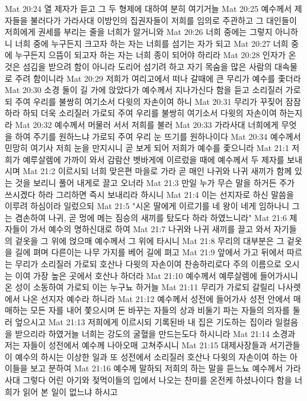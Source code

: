 Mat 20:24  열 제자가 듣고 그 두 형제에 대하여 분히 여기거늘
Mat 20:25  예수께서 제자들을 불러다가 가라사대 이방인의 집권자들이 저희를 임의로 주관하고 그 대인들이 저희에게 권세를 부리는 줄을 너희가 알거니와
Mat 20:26  너희 중에는 그렇지 아니하니 너희 중에 누구든지 크고자 하는 자는 너희를 섬기는 자가 되고
Mat 20:27  너희 중에 누구든지 으뜸이 되고자 하는 자는 너희 종이 되어야 하리라
Mat 20:28  인자가 온것은 섬김을 받으려 함이 아니라 도리어 섬기려 하고 자기 목숨을 많은 사람의 대속물로 주려 함이니라
Mat 20:29  저희가 여리고에서 떠나 갈때에 큰 무리가 예수를 좇더라
Mat 20:30  소경 둘이 길 가에 앉았다가 예수께서 지나가신다 함을 듣고 소리질러 가로되 주여 우리를 불쌍히 여기소서 다윗의 자손이여 하니
Mat 20:31  무리가 꾸짖어 잠잠하라 하되 더욱 소리질러 가로되 주여 우리를 불쌍히 여기소서 다윗의 자손이여 하는지라
Mat 20:32  예수께서 머물러 서서 저희를 불러
Mat 20:33  가라사대 너희에게 무엇을 하여 주기를 원하느냐 가로되 주여 우리 눈 뜨기를 원하나이다
Mat 20:34  예수께서 민망히 여기사 저희 눈을 만지시니 곧 보게 되어 저희가 예수를 좇으니라
Mat 21:1  저희가 예루살렘에 가까이 와서 감람산 벳바게에 이르렀을 때에 예수께서 두 제자를 보내시며
Mat 21:2  이르시되 너희 맞은편 마을로 가라 곧 매인 나귀와 나귀 새끼가 함께 있는 것을 보리니 풀어 내게로 끌고 오너라
Mat 21:3  만일 누가 무슨 말을 하거든 주가 쓰시겠다 하라 그리하면 즉시 보내리라 하시니
Mat 21:4  이는 선지자로 하신 말씀을 이루려 하심이라 일렀으되
Mat 21:5  "시온 딸에게 이르기를 네 왕이 네게 임하나니 그는 겸손하여 나귀, 곧 멍에 메는 짐승의 새끼를 탔도다 하라 하였느니라"
Mat 21:6  제자들이 가서 예수의 명하신대로 하여
Mat 21:7  나귀와 나귀 새끼를 끌고 와서 자기들의 겉옷을 그 위에 얹으매 예수께서 그 위에 타시니
Mat 21:8  무리의 대부분은 그 겉옷을 길에 펴며 다른이는 나무 가지를 베어 길에 펴고
Mat 21:9  앞에서 가고 뒤에서 따르는 무리가 소리질러 가로되 호산나 다윗의 자손이여 찬송하리로다 주의 이름으로 오시는 이여 가장 높은 곳에서 호산나 하더라
Mat 21:10  예수께서 예루살렘에 들어가시니 온 성이 소동하여 가로되 이는 누구뇨 하거늘
Mat 21:11  무리가 가로되 갈릴리 나사렛에서 나온 선지자 예수라 하니라
Mat 21:12  예수께서 성전에 들어가사 성전 안에서 매매하는 모든 자를 내어 쫓으시며 돈 바꾸는 자들의 상과 비둘기 파는 자들의 의자를 둘러 엎으시고
Mat 21:13  저희에게 이르시되 기록된바 내 집은 기도하는 집이라 일컬음을 받으리라 하였거늘 너희는 강도의 굴혈을 만드는도다 하시니라
Mat 21:14  소경과 저는 자들이 성전에서 예수께 나아오매 고쳐주시니
Mat 21:15  대제사장들과 서기관들이 예수의 하시는 이상한 일과 또 성전에서 소리질러 호산나 다윗의 자손이여 하는 아이들을 보고 분하여
Mat 21:16  예수께 말하되 저희의 하는 말을 듣느뇨 예수께서 가라사대 그렇다 어린 아기와 젖먹이들의 입에서 나오는 찬미를 온전케 하셨나이다 함을 너희가 읽어 본 일이 없느냐 하시고
